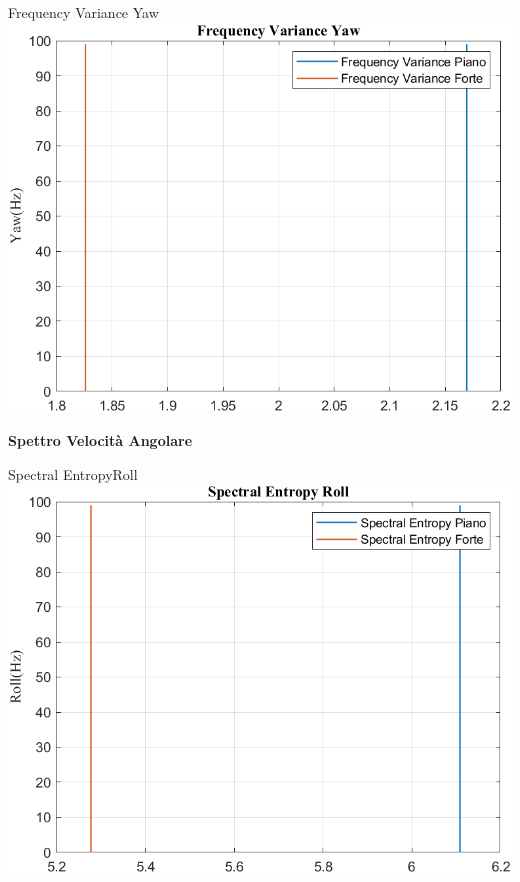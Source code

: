 \documentclass[beamer]{standalone}
\begin{document}
	\begin{frame}{{Frequency Variance Yaw}}
		\centering\includegraphics[height=.8\textheight]{figure/VAng/Trasformata/Frequency VarianceYaw}
	\end{frame}
	
	\begin{frame}
		\color{blue}\centering\huge{\textbf{Spettro Velocità Angolare}}
	\end{frame}
	
	\begin{frame}{{Spectral EntropyRoll}}
		\centering\includegraphics[height=.8\textheight]{figure/VAng/Trasformata/Spectral EntropyRoll}
	\end{frame}
	
\end{document}
